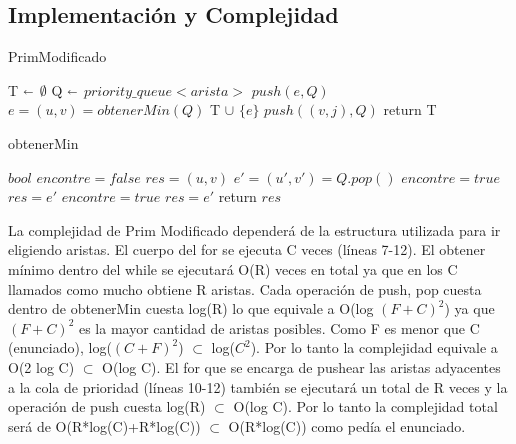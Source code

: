 \subsection{Implementación y Complejidad}

\begin{algorithm}[H]
\caption{PrimModificado}\label{ej1}
\begin{algorithmic}[1]
	\State T  $\shortleftarrow$ $\emptyset$
	\State Q  $\shortleftarrow$ $priority\_queue<arista>$
	 
		\State $push(e,Q)$
	\EndFor
		\State $e=(u,v)=obtenerMin(Q)$
		\State T $\cup$ $\{e\}$
			\State $push((v,j),Q)$
		\EndFor
	\EndFor
	\State return T
\EndProcedure
\end{algorithmic}
\end{algorithm}

\begin{algorithm}[H]
\caption{obtenerMin}\label{ej1}
\begin{algorithmic}[1]
	\State $bool$ $encontre=false$
	\State $res=(u,v)$
	\State $e'=(u',v')=Q.pop()$
		\State $encontre=true$
		\State $res=e'$
	\Else
			\State $encontre=true$
			\State $res=e'$
		\EndIf
	\EndIf
	\EndWhile
	\State return $res$
\EndProcedure
\end{algorithmic}
\end{algorithm}

La complejidad de Prim Modificado dependerá de la estructura utilizada para ir eligiendo aristas. El cuerpo del for se ejecuta C veces (líneas 7-12). El obtener mínimo dentro del while se ejecutará O(R) veces en total ya que en los C llamados como mucho obtiene R aristas. Cada operación de push, pop cuesta dentro de obtenerMin cuesta log(R) lo que equivale a O(log $(F+C)^2$) ya que $(F+C)^2$ es la mayor cantidad de aristas posibles. Como F es menor que C (enunciado), log($(C+F)^2$) $\subset$ log($C^2$). Por lo tanto la complejidad equivale a O(2 log C) $\subset$ O(log C). El for que se encarga de pushear las aristas adyacentes a la cola de prioridad (líneas 10-12) también se ejecutará un total de R veces y la operación de push cuesta log(R) $\subset$ O(log C). Por lo tanto la complejidad total será de O(R*log(C)+R*log(C)) $\subset$ O(R*log(C)) como pedía el enunciado.

